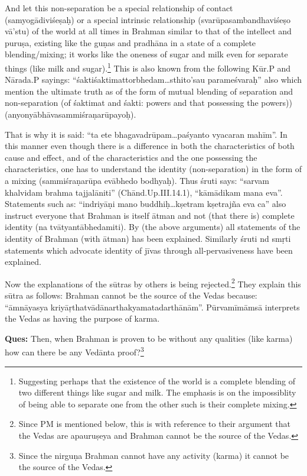 \vskip 2pt

And let this non-separation be a special relationship of contact (samyogādiviśeṣaḥ) or a special intrinsic relationship (svarūpasambandhaviśeṣo vā’stu) of the world at all times in Brahman similar to that of the intellect and puruṣa, existing like the guṇas and pradhāna in a state of a complete blending/mixing; it works like the oneness of sugar and milk even for separate things (like milk and sugar).\footnote{Suggesting perhaps that the existence of the world is a complete blending of two different things like sugar and milk. The emphasis is on the impossiblity of being able to separate one from the other such is their complete mixing.} This is also known from the following Kūr.P and Nārada.P sayings: “śaktiśaktimattorbhedam…sthito’sau parameśvaraḥ” also which mention the ultimate truth as of the form of mutual blending of separation and non-separation (of śaktimat and śakti: powers and that possessing the powers)) (anyonyābhāvasammiśraṇarūpayoḥ).

\vskip 2pt

That is why it is said: “ta ete bhagavadrūpam…paśyanto vyacaran mahīm”. In this manner even though there is a difference in both the characteristics of both cause and effect, and of the characteristics and the one possessing the characteristics, one has to understand the identity (non-separation) in the form of a mixing (sammiśraṇarūpa evābhedo bodhyaḥ). Thus śruti says: “sarvam khalvidam brahma tajjalāniti” (Chānd.Up.III.14.1), “kāmādikam mana eva”. Statements such as: “indriyāṇi mano buddhiḥ…kṣetram kṣetrajña eva ca” also instruct everyone that Brahman is itself ātman and not (that there is) complete identity (na tvātyantābhedamiti). By (the above arguments) all statements of the identity of Brahman (with ātman) has been explained. Similarly śruti nd smṛti statements which advocate identity of jīvas through all-pervasiveness have been explained.

\vskip 2pt

Now the explanations of the sūtras by others is being rejected.\footnote{Since PM is mentioned below, this is with reference to their argument that the Vedas are apauruṣeya and Brahman cannot be the source of the Vedas.} They explain this sūtra as follows: Brahman cannot be the source of the Vedas because: “āmnāyasya kriyāṛthatvādānarthakyamatadarthā\-nām”. Pūrvamīmāmsā interprets the Vedas as having the purpose of karma. 

\textbf{Ques:} Then, when Brahman is proven to be without any qualities (like karma) how can there be any Vedānta proof?\footnote{Since the nirguṇa Brahman cannot have any activity (karma) it cannot be the source of the Vedas.}

